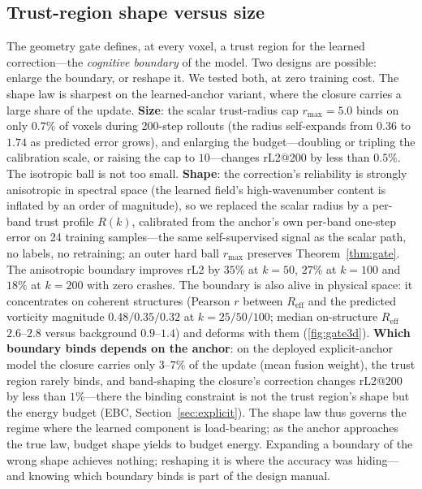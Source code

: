 \documentclass[11pt,a4paper]{article}
\begin{document}
\subsection{Trust-region shape versus size}\label{sec:shape}

The geometry gate defines, at every voxel, a trust region for the learned correction---the \emph{cognitive boundary} of the model. Two designs are possible: enlarge the boundary, or reshape it. We tested both, at zero training cost. The shape law is sharpest on the learned-anchor variant, where the closure carries a large share of the update. \textbf{Size}: the scalar trust-radius cap $r_{\max}{=}5.0$ binds on only $0.7\%$ of voxels during 200-step rollouts (the radius self-expands from $0.36$ to $1.74$ as predicted error grows), and enlarging the budget---doubling or tripling the calibration scale, or raising the cap to $10$---changes rL2@200 by less than $0.5\%$. The isotropic ball is not too small. \textbf{Shape}: the correction's reliability is strongly anisotropic in spectral space (the learned field's high-wavenumber content is inflated by an order of magnitude), so we replaced the scalar radius by a per-band trust profile $R(k)$, calibrated from the anchor's own per-band one-step error on 24 training samples---the same self-supervised signal as the scalar path, no labels, no retraining; an outer hard ball $r_{\max}$ preserves Theorem~\ref{thm:gate}. The anisotropic boundary improves rL2 by $35\%$ at $k{=}50$, $27\%$ at $k{=}100$ and $18\%$ at $k{=}200$ with zero crashes. The boundary is also alive in physical space: it concentrates on coherent structures (Pearson $r$ between $R_{\mathrm{eff}}$ and the predicted vorticity magnitude $0.48/0.35/0.32$ at $k{=}25/50/100$; median on-structure $R_{\mathrm{eff}}$ $2.6$--$2.8$ versus background $0.9$--$1.4$) and deforms with them (\ref{fig:gate3d}). \textbf{Which boundary binds depends on the anchor}: on the deployed explicit-anchor model the closure carries only $3$--$7\%$ of the update (mean fusion weight), the trust region rarely binds, and band-shaping the closure's correction changes rL2@200 by less than $1\%$---there the binding constraint is not the trust region's shape but the energy budget (EBC, Section~\ref{sec:explicit}). The shape law thus governs the regime where the learned component is load-bearing; as the anchor approaches the true law, budget shape yields to budget energy. Expanding a boundary of the wrong shape achieves nothing; reshaping it is where the accuracy was hiding---and knowing which boundary binds is part of the design manual.
\end{document}
